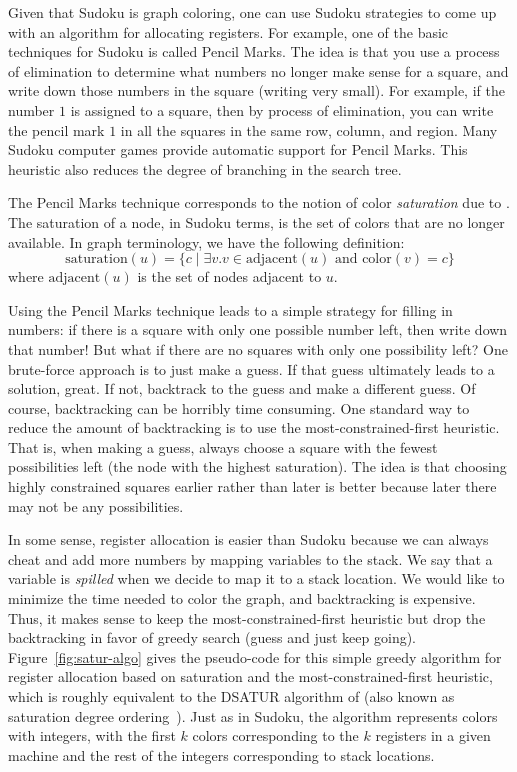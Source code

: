 \documentclass[11pt]{book}
\begin{document}
Given that Sudoku is graph coloring, one can use Sudoku strategies to
come up with an algorithm for allocating registers. For example, one
of the basic techniques for Sudoku is called Pencil Marks. The idea is
that you use a process of elimination to determine what numbers no
longer make sense for a square, and write down those numbers in the
square (writing very small). For example, if the number $1$ is
assigned to a square, then by process of elimination, you can write
the pencil mark $1$ in all the squares in the same row, column, and
region. Many Sudoku computer games provide automatic support for
Pencil Marks. This heuristic also reduces the degree of branching in
the search tree.

The Pencil Marks technique corresponds to the notion of color
\emph{saturation} due to \cite{Brelaz:1979eu}.  The saturation of a
node, in Sudoku terms, is the set of colors that are no longer
available. In graph terminology, we have the following definition:
\begin{equation*}
  \mathrm{saturation}(u) = \{ c \;|\; \exists v. v \in \mathrm{adjacent}(u)
     \text{ and } \mathrm{color}(v) = c \}
\end{equation*}
where $\mathrm{adjacent}(u)$ is the set of nodes adjacent to $u$.

Using the Pencil Marks technique leads to a simple strategy for
filling in numbers: if there is a square with only one possible number
left, then write down that number! But what if there are no squares
with only one possibility left? One brute-force approach is to just
make a guess. If that guess ultimately leads to a solution, great.  If
not, backtrack to the guess and make a different guess.  Of course,
backtracking can be horribly time consuming. One standard way to
reduce the amount of backtracking is to use the most-constrained-first
heuristic. That is, when making a guess, always choose a square with
the fewest possibilities left (the node with the highest saturation).
The idea is that choosing highly constrained squares earlier rather
than later is better because later there may not be any possibilities.

In some sense, register allocation is easier than Sudoku because we
can always cheat and add more numbers by mapping variables to the
stack. We say that a variable is \emph{spilled} when we decide to map
it to a stack location. We would like to minimize the time needed to
color the graph, and backtracking is expensive. Thus, it makes sense
to keep the most-constrained-first heuristic but drop the backtracking
in favor of greedy search (guess and just keep going).
Figure~\ref{fig:satur-algo} gives the pseudo-code for this simple
greedy algorithm for register allocation based on saturation and the
most-constrained-first heuristic, which is roughly equivalent to the
DSATUR algorithm of \cite{Brelaz:1979eu} (also known as saturation
degree ordering~\citep{Gebremedhin:1999fk,Omari:2006uq}).  Just
as in Sudoku, the algorithm represents colors with integers, with the
first $k$ colors corresponding to the $k$ registers in a given machine
and the rest of the integers corresponding to stack locations.
\end{document}
